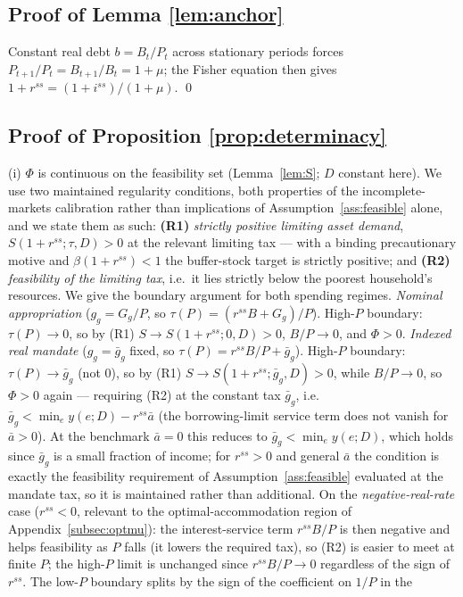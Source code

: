 \documentclass[12pt]{article}
\newcommand{\Sfun}{S}
\begin{document}
\subsection{Proof of Lemma \ref{lem:anchor}}
Constant real debt $b=B_t/P_t$ across stationary periods forces
$P_{t+1}/P_t=B_{t+1}/B_t=1+\mu$; the Fisher equation then gives
$1+r^{ss}=(1+i^{ss})/(1+\mu)$. \qed

\subsection{Proof of Proposition \ref{prop:determinacy}}
(i) $\Phi$ is continuous on the feasibility set (Lemma~\ref{lem:S};
$D$ constant here). We use two maintained regularity conditions, both
properties of the incomplete-markets calibration rather than implications of
Assumption~\ref{ass:feasible} alone, and we state them as such: \textbf{(R1)}
\emph{strictly positive limiting asset demand}, $\Sfun(1+r^{ss};\tau,D)>0$ at
the relevant limiting tax --- with a binding precautionary motive and
$\beta(1+r^{ss})<1$ the buffer-stock target is strictly positive; and
\textbf{(R2)} \emph{feasibility of the limiting tax}, i.e.\ it lies strictly
below the poorest household's resources. We give the boundary argument for both
spending regimes.
\emph{Nominal appropriation} ($g_g=G_g/P$, so $\tau(P)=(r^{ss}B+G_g)/P$).
High-$P$ boundary: $\tau(P)\to0$, so by (R1)
$\Sfun\to\Sfun(1+r^{ss};0,D)>0$, $B/P\to0$, and $\Phi>0$. \emph{Indexed real
mandate} ($g_g=\bar g_g$ fixed, so $\tau(P)=r^{ss}B/P+\bar g_g$). High-$P$
boundary: $\tau(P)\to\bar g_g$ (not $0$), so by (R1)
$\Sfun\to\Sfun(1+r^{ss};\bar g_g,D)>0$, while $B/P\to0$, so $\Phi>0$ again ---
requiring (R2) at the constant tax $\bar g_g$, i.e.\
$\bar g_g<\min_e y(e;D) - r^{ss}\bar a$ (the borrowing-limit service
term does not vanish for $\bar a>0$). At the benchmark $\bar a=0$ this
reduces to $\bar g_g<\min_e y(e;D)$, which holds since $\bar g_g$ is a
small fraction of income; for $r^{ss}>0$ and general $\bar a$ the
condition is exactly the feasibility requirement of
Assumption~\ref{ass:feasible} evaluated at the mandate tax, so it is
maintained rather than additional. On the
\emph{negative-real-rate} case ($r^{ss}<0$, relevant to the
optimal-accommodation region of Appendix~\ref{subsec:optmu}): the
interest-service term $r^{ss}B/P$ is then negative and helps
feasibility as $P$ falls (it lowers the required tax), so (R2) is easier to meet
at finite $P$; the high-$P$ limit is unchanged since $r^{ss}B/P\to0$ regardless
of the sign of $r^{ss}$.
The low-$P$ boundary splits by the sign of the coefficient on $1/P$ in the
\end{document}
